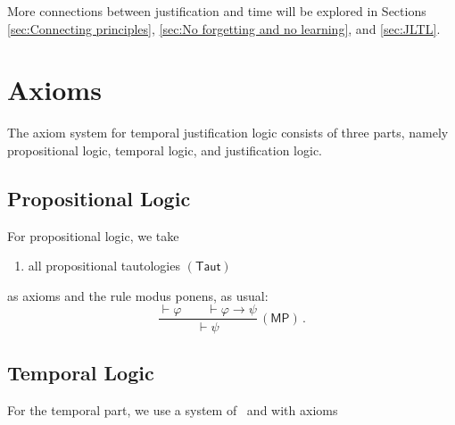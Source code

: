 \documentclass[envcountsect,envcountsame,oribibl,orivec]{llncs}
\newcommand{\propax}{\ensuremath{(\textsf{Taut})}}
\newcommand{\lrule}[2]{\displaystyle{\frac{#1}{#2}}}
\newcommand{\mprule}{\ensuremath{(\textsf{MP})}}
\newcommand{\limplies}{\rightarrow}
\newcounter{enumsave}
\renewcommand{\phi}{\varphi}
\begin{document}
More connections between justification and time will be explored in Sections \ref{sec:Connecting principles}, \ref{sec:No forgetting and no learning}, and \ref{sec:JLTL}.
 \section{Axioms}
 \label{sec:Axioms}

  The axiom system for temporal justification logic consists of three parts, namely propositional logic, temporal logic, and justification logic.

 \subsection*{Propositional Logic}
 For propositional logic, we take
 \begin{enumerate}
  \setcounter{enumi}{\theenumsave}
  \item all propositional tautologies \hfill \propax
  \setcounter{enumsave}{\theenumi}
 \end{enumerate}
 as axioms and the rule modus ponens, as usual:
 \[
   \lrule{\vdash \phi \qquad \vdash \phi \limplies \psi}{\vdash \psi}\,\mprule \, .
 \]

 \subsection*{Temporal Logic}
 For the temporal part, we use a system of~\cite{Gabbay,Gol87,Gor99} and  \cite{PnueliLichtensteinZuck1985,PnueliLichtenstein2000,FrenchMeydenReynolds2004}
 with axioms \\
 
\end{document}
